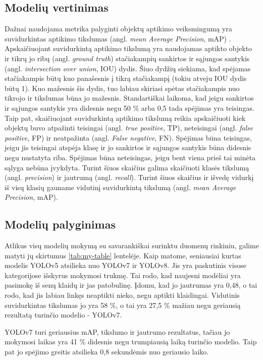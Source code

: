 \documentclass{VUMIFPSkursinis}
\begin{document}
\subsection{Modelių vertinimas}
Dažnai naudojama metrika palyginti objektų aptikimo veiksmingumą yra suvidurkintas aptikimo tikslumas (angl. \emph{mean Average Precision}, mAP) \cite{meanaverage}. Apskaičiuojant suvidurkintą aptikimo tikslumą yra naudojamas aptikto objekto ir tikrų jo ribų (angl. \emph{ground truth}) stačiakampių sankirtos ir sąjungos santykis (angl. \emph{intersection over union}, IOU) dydis. Šiuo dydžių siekiama, kad spėjamas stačiakampis būtų kuo panašesnis į tikrą stačiakampį (tokiu atveju IOU dydis būtų 1). Kuo mažesnis šis dydis, tuo labiau skiriasi spėtas stačiakampis nuo tikrojo ir tikslumas būna jo mažesnis. Standartiškai laikoma, kad jeigu sankirtos ir sąjungos santykis yra didesnis negu 50 \% arba 0,5 tada spėjimas yra teisingas. Taip pat, skaičiuojant suvidurkintą aptikimo tikslumą reikia apskaičiuoti kiek objektų buvo atpažinti teisingai (angl. \emph{true positive}, TP), neteisingai (angl. \emph{false positive}, FP) ir neatpažinta (angl. \emph{False negative}, FN). Spėjimas būna teisingas, jeigu jis teisingai atspėja klasę ir jo sankirtos ir sąjungos santykis būna didesnis negu nustatyta riba. Spėjimas būna neteisingas, jeigu bent viena prieš tai minėta sąlyga nebūna įvykdyta. Turint šiuos skaičius galima skaičiuoti klasės tikslumą (angl. \emph{precision}) ir jautrumą (angl. \emph{recall}). Turint šiuos skaičius ir išvedę vidurkį iš visų klasių gauname vidutinį suvidurkintą tikslumą (angl. \emph{mean Average Precision}, mAP).

\subsection{Modelių palyginimas}
Atlikus visų modelių mokymą su savarankiškai surinktu duomenų rinkiniu, galime matyti jų skirtumus \ref{tab:my-table} lentelėje. Kaip matome, seniausiai kurtas modelis YOLOv5 atsilieka nuo YOLOv7 ir YOLOv8. 
Jis yra paskutinis visose kategorijose išskyrus mokymosi trukmę. Tai rodo, kad naujesni modėliai yra pasimokę iš senų klaidų ir jas patobulinę. Įdomu, kad jo jautrumas yra 0,48, o tai rodo, kad jis labiau linkęs neaptikti nieko, negu aptikti klaidingai.  Vidutinis suvidurkintas tikslumas jo yra 58 \%, o tai yra 27,5 \% mažiau negu geriausią rezultatą turinčio modelio - YOLOv7.

YOLOv7 turi geriausius mAP, tikslumo ir jautrumo rezultatus, tačiau jo mokymosi laikas yra 41 \% didesnis negu trumpiausią laiką turinčio modelio. Taip pat jo spėjimo greitis atsilieka 0,8 sekundėmis nuo geriausio laiko. 
\end{document}
